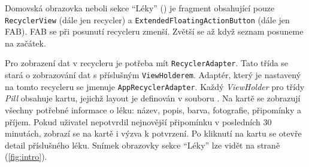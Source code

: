 \documentclass[../TakeYourPill.tex]{subfiles}
\begin{document}
Domovská obrazovka neboli sekce \enquote{Léky} () je fragment obsahující pouze \texttt{RecyclerView} (dále jen recycler) a \texttt{ExtendedFloatingActionButton} (dále jen FAB). FAB se při posunutí recycleru zmenší. Zvětší se až když seznam posuneme na začátek. 

Pro zobrazení dat v recycleru je potřeba mít \texttt{RecyclerAdapter}. Tato třída se stará o zobrazování dat s příslušným \texttt{ViewHolderem}. Adaptér, který je nastavený na tomto recycleru se jmenuje \texttt{AppRecyclerAdapter}. Každý \emph{ViewHolder} pro třídy \emph{Pill} obsahuje kartu, jejichž layout je definován v souboru . Na kartě se zobrazují všechny potřebné informace o léku: název, popis, barva, fotografie, připomínky a příjem. Pokud uživatel nepotvrdil nejnovější připomínku v posledních 30 minutách, zobrazí se na kartě i výzva k potvrzení. Po kliknutí na kartu se otevře detail příslušného léku. Snímek obrazovky sekce \enquote{Léky} lze vidět na straně \pageref{fig:intro} (\ref{fig:intro}).



\end{document}
